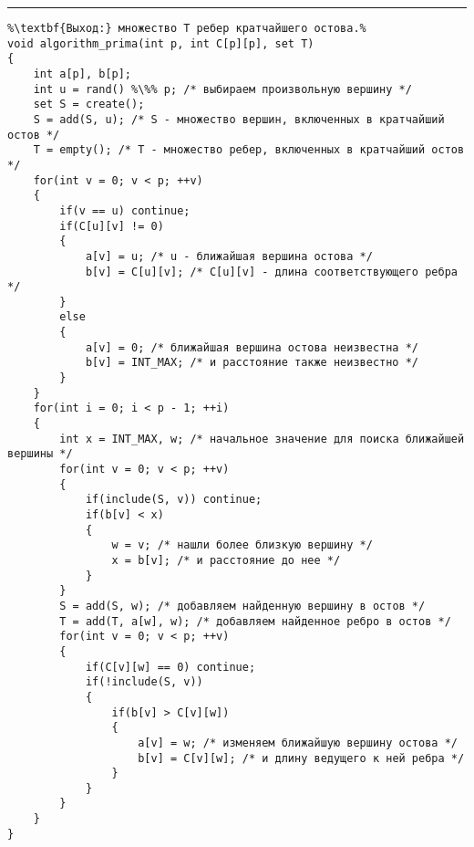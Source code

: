 \vspace{5pt} \hrule
\begin{lstlisting}[caption={Алгоритм Прима}, label=p330, escapechar=\%]
%\noindent\textbf{Вход:} граф G(V, E), заданный матрицей длин ребер C.\\%
%\textbf{Выход:} множество T ребер кратчайшего остова.%
void algorithm_prima(int p, int C[p][p], set T)
{
	int a[p], b[p];
	int u = rand() %\%% p; /* выбираем произвольную вершину */
	set S = create();
	S = add(S, u); /* S - множество вершин, включенных в кратчайший остов */
	T = empty(); /* T - множество ребер, включенных в кратчайший остов */
	for(int v = 0; v < p; ++v)
	{
		if(v == u) continue;
		if(C[u][v] != 0)
		{
			a[v] = u; /* u - ближайшая вершина остова */
			b[v] = C[u][v]; /* C[u][v] - длина соответствующего ребра */
		}
		else
		{
			a[v] = 0; /* ближайшая вершина остова неизвестна */
			b[v] = INT_MAX; /* и расстояние также неизвестно */
		}
	}
	for(int i = 0; i < p - 1; ++i)
	{
		int x = INT_MAX, w; /* начальное значение для поиска ближайшей вершины */
		for(int v = 0; v < p; ++v)
		{
			if(include(S, v)) continue;
			if(b[v] < x)
			{
				w = v; /* нашли более близкую вершину */
				x = b[v]; /* и расстояние до нее */
			}
		}
		S = add(S, w); /* добавляем найденную вершину в остов */
		T = add(T, a[w], w); /* добавляем найденное ребро в остов */
		for(int v = 0; v < p; ++v)
		{
			if(C[v][w] == 0) continue;
			if(!include(S, v))
			{
				if(b[v] > C[v][w])
				{
					a[v] = w; /* изменяем ближайшую вершину остова */
					b[v] = C[v][w]; /* и длину ведущего к ней ребра */
				}
			}
		}
	}
}
\end{lstlisting}
